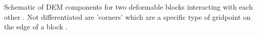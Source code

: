 \label{fig:dem} Schematic of DEM components for two deformable blocks interacting with each other \cite{itasca_udec_2011}. Not differentiated are 'corners' which are a specific type of gridpoint on the edge of a block .
